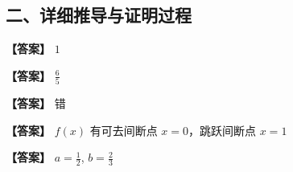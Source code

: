 \documentclass[
  a4paper,
  11pt,
  title in boldface,
  theorem in new line,
  remove problem qed
]{homework}
\begin{document}
\subsection*{二、详细推导与证明过程}

\begin{solution}[第 11 题解答]
  \textbf{【答案】} $1$

\end{solution}

\begin{solution}[第 12 题解答]
  \textbf{【答案】} $\frac{6}{5}$

\end{solution}

\begin{solution}[第 13 题解答]
  \textbf{【答案】} 错

\end{solution}

\begin{solution}[第 14 题解答]
  \textbf{【答案】} $f(x)$ 有可去间断点 $x=0$，跳跃间断点 $x=1$

\end{solution}

\begin{solution}[第 15 题解答]
  \textbf{【答案】} $a = \frac{1}{2}$, $b = \frac{2}{3}$

\end{solution}
\end{document}

